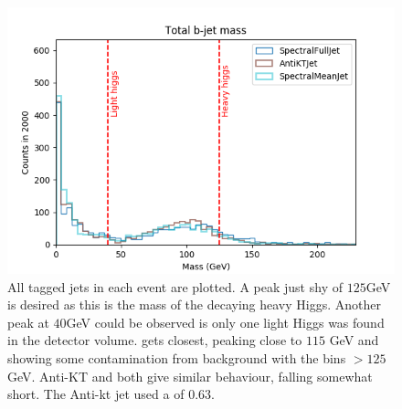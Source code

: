 \begin{figure}[htp]
    \begin{minipage}[c]{0.5\textwidth}
        \includegraphics[width=1\textwidth]{graphics/best_all.png}
    \end{minipage}\hfill
    \begin{minipage}[c]{0.45\textwidth}
        \caption{All tagged jets in each event are plotted.
            A peak just shy of \(125\)GeV is desired as this is the mass of the decaying
            heavy Higgs.
            Another peak at \(40\)GeV could be observed is only one light Higgs
            was found in the detector volume.
            \spectralfulljet{} gets closest, peaking close to \(115\) GeV and
            showing some contamination from background with the bins \(>125\) GeV.
            Anti-KT and \spectralmeanjet{} both give similar behaviour, falling somewhat short.
            The Anti-kt jet used a \stoppingdeltar{} of \(0.63\).
        }\label{fig:best_all}
    \end{minipage}
\end{figure}    


